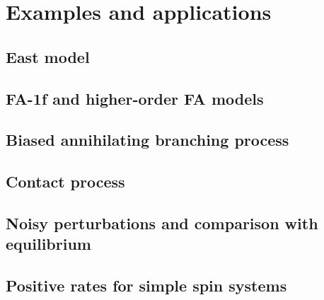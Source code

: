 \section{Examples and applications}
\label{sec:applications}

\subsection{East model}

\subsection{FA-1f and higher-order FA models}

\subsection{Biased annihilating branching process}

\subsection{Contact process}

\subsection{Noisy perturbations and comparison with equilibrium}

\subsection{Positive rates for simple spin systems}
